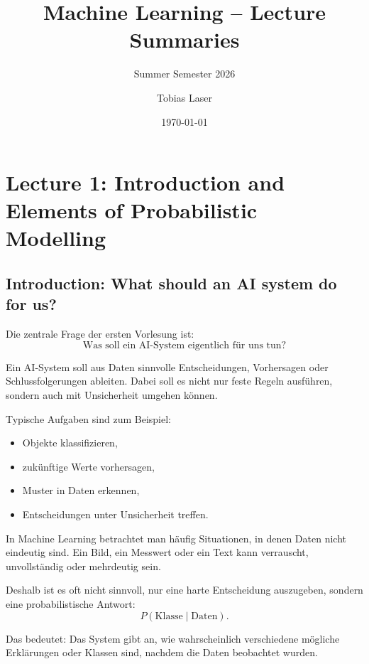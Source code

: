 \documentclass[11pt,a4paper]{scrartcl}
\begin{document}
    \title{Machine Learning -- Lecture Summaries}
    \subtitle{Summer Semester 2026}
    \author{Tobias Laser}
    \date{\today}
    \maketitle
    \vfill
    \thispagestyle{empty}
    \newpage

    \tableofcontents
    \newpage


\section{Lecture 1: Introduction and Elements of Probabilistic Modelling}

\subsection{Introduction: What should an AI system do for us?}

\begin{notebox}
    Die zentrale Frage der ersten Vorlesung ist:
    \[
        \text{Was soll ein AI-System eigentlich für uns tun?}
    \]

    Ein AI-System soll aus Daten sinnvolle Entscheidungen, Vorhersagen oder
    Schlussfolgerungen ableiten. Dabei soll es nicht nur feste Regeln ausführen,
    sondern auch mit Unsicherheit umgehen können.

    Typische Aufgaben sind zum Beispiel:
    \begin{itemize}
        \item Objekte klassifizieren,
        \item zukünftige Werte vorhersagen,
        \item Muster in Daten erkennen,
        \item Entscheidungen unter Unsicherheit treffen.
    \end{itemize}
\end{notebox}

\begin{solutionbox}
    In Machine Learning betrachtet man häufig Situationen, in denen Daten nicht
    eindeutig sind. Ein Bild, ein Messwert oder ein Text kann verrauscht,
    unvollständig oder mehrdeutig sein.

    Deshalb ist es oft nicht sinnvoll, nur eine harte Entscheidung auszugeben,
    sondern eine probabilistische Antwort:
    \[
        P(\text{Klasse} \mid \text{Daten}).
    \]

    Das bedeutet: Das System gibt an, wie wahrscheinlich verschiedene mögliche
    Erklärungen oder Klassen sind, nachdem die Daten beobachtet wurden.
\end{solutionbox}
\end{document}
